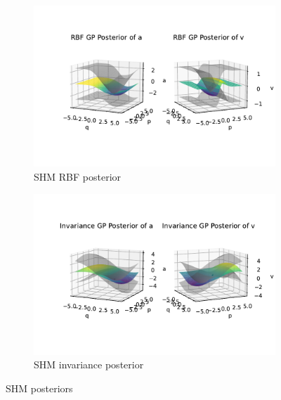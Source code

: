 \documentclass{statsmsc}
\begin{document}
\begin{figure}[H]
     \centering
     \begin{subfigure}[b]{\linewidth}
        \centering
        \includegraphics[width=\linewidth]{../codes/figures/posterior_shm_rbf.pdf}
        \caption{SHM RBF posterior}
        \label{fig:posterior_shm_rbf}
     \end{subfigure}
     \hfill
     \begin{subfigure}[b]{\linewidth}
         \centering
         \includegraphics[width=\linewidth]{../codes/figures/posterior_shm_invariance.pdf}
         \caption{SHM invariance posterior}
         \label{fig:posterior_shm_invariance}
     \end{subfigure}
        \caption{SHM posteriors}
        \label{fig:posterior_shm}
\end{figure}
\end{document}
